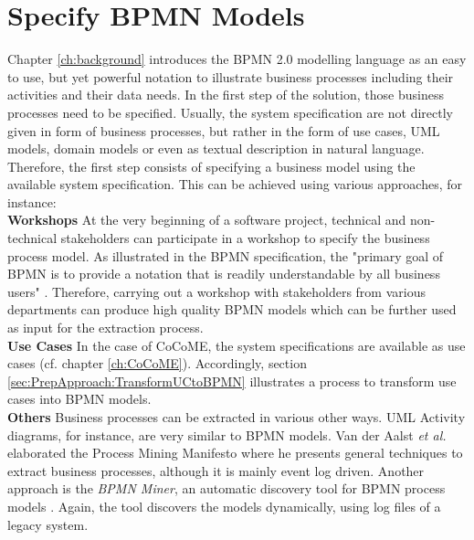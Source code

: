\section{Specify BPMN Models}
\label{sec:Solution:SpecifyBPMN}
Chapter \ref{ch:background} introduces the BPMN 2.0 modelling language as an easy to use, but yet powerful notation to illustrate business processes including their activities and their data needs.
In the first step of the solution, those business processes need to be specified. Usually, the system specification are not directly given in form of business processes, but rather in the form of use cases, UML models, domain models or even as textual description in natural language. Therefore, the first step consists of specifying a business model using the available system specification. This can be achieved using various approaches, for instance: \\





\noindent
\textbf{Workshops} At the very beginning of a software project, technical and non-technical stakeholders can participate in a workshop to specify the business process model. As illustrated in the BPMN specification, the "primary goal of BPMN is to provide a notation that is readily understandable by all business users"  \cite{OMG}. Therefore, carrying out a workshop with stakeholders from various departments can produce high quality BPMN models which can be further used as input for the extraction process.\\
\textbf{Use Cases} In the case of CoCoME, the system specifications are available as use cases (cf. chapter \ref{ch:CoCoME}). 
Accordingly, section \ref{sec:PrepApproach:TransformUCtoBPMN} illustrates a process to transform use cases into BPMN models.  \\
\textbf{Others} Business processes can be extracted in various other ways. UML Activity diagrams, for instance, are very similar to BPMN models. Van der Aalst \textit{et al.} elaborated the Process Mining Manifesto \cite{ProcessMiningManifesto} where he presents general techniques to extract business processes, although it is mainly event log driven. Another approach is the \textit{BPMN Miner}, an automatic discovery tool for BPMN process models \cite{BPMNMiner}. Again, the tool discovers the models dynamically, using log files of a legacy system.





